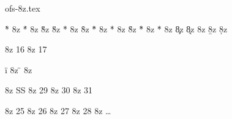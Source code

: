

\ifx \characterdef \undefined  \fi
\protectreading ofs-8z.tex %



\accentdef  \` *    8z  { }                   %
\accentdef  \' *    8z  { }                   %
\accentdef  \v *    8z  { }                   %
\accentdef  \u *    8z  { }                   %
\accentdef  \= *    8z  { }                   %
\accentdef  \r *    8z  { }                   %
\accentdef  \^ *    8z  { }                   %
\accentdef  \. *    8z  { }                   %
\accentdef  \H *    8z  { }                  %
\accentdef  \~ *    8z  { }                  %
\accentdef  \" *    8z  { }                  %
\accentdef  \c *    8z  {}   %
\accentdef  \k *    8z  {}  %
\accentdef  \m *    8z  {\accentbelow {,}{.1ex}}        %
\accentdef  \b *    8z  {} %
\accentdef  \d *    8z  {}        %


\def\aa{\r a}
\def\AA{\r A}

\characterdef \dotlessi    8z  16 
\characterdef \dotlessj    8z  17
\let\i=\dotlessi  \let\j=\dotlessj

\accentdef \" i     8z  { \dotlessi}
\accentdef \" {\i}  8z  { \dotlessi}

\let\SS=\relax \let\AE=\relax \let\OE=\relax \let\O=\relax
\characterdef \SS   8z  {SS}
\characterdef \AE   8z  29
\characterdef \OE   8z  30
\characterdef \O    8z  31 

\let\ss=\relax \let\ae=\relax \let\oe=\relax \let\o=\relax
\characterdef \ss   8z  25
\characterdef \ae   8z  26
\characterdef \oe   8z  27
\characterdef \o    8z  28 
\characterdef \ellipsis 8z {\dots}


